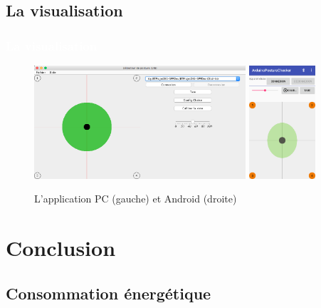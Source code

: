 \documentclass{beamer}
\begin{document}
\subsection{La visualisation}
\begin{frame}
\frametitle{\textcolor{white}{La visualisation}}
\begin{figure}[htbp]
\begin{center}
\includegraphics[height=4.2cm]{images/screenshot_pc1}
\hspace{0.1cm}
\includegraphics[height=4.2cm]{images/screenshot_android1.png}
\end{center}
\caption{L'application PC (gauche) et Android (droite)}
\label{fig:screenshot_pc}
\end{figure}
\end{frame}

\section{Conclusion}

\subsection{Consommation énergétique}
\end{document}
